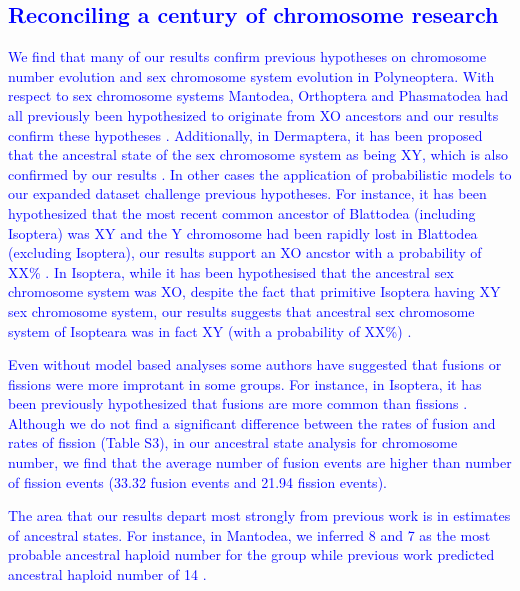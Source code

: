 \documentclass[]{rsos}%
\begin{document}
\subsection{\textcolor{blue}{Reconciling a century of chromosome research}}
\textcolor{blue}{We find that many of our results confirm previous hypotheses on chromosome number evolution and sex chromosome system evolution in Polyneoptera.
With respect to sex chromosome systems Mantodea, Orthoptera and Phasmatodea had all previously been hypothesized to originate from XO ancestors and our results confirm these hypotheses \cite{hughes1950chromosomes,blackmon2016, blackman1995sex}. 
Additionally, in Dermaptera, it has been proposed that the ancestral state of the sex chromosome system as being XY, which is also confirmed by our results \cite{blackman1995sex}.
In other cases the application of probabilistic models to our expanded dataset challenge previous hypotheses.
For instance, it has been hypothesized that the most recent common ancestor of Blattodea (including Isoptera) was XY and the Y chromosome had been rapidly lost in Blattodea (excluding Isoptera), our results support an XO ancstor with a probability of XX\% \cite{luykx1990cytogenetic, bergamaschi2007karyology}.
In Isoptera, while it has been hypothesised that the ancestral sex chromosome system was XO, despite the fact that primitive Isoptera having XY sex chromosome system, our results suggests that ancestral sex chromosome system of Isopteara was in fact XY (with a probability of XX\%) \cite{luykx1990cytogenetic,blackman1995sex}.}
 
\textcolor{blue}{Even without model based analyses some authors have suggested that fusions or fissions were more improtant in some groups.
For instance, in Isoptera, it has been previously hypothesized that fusions are more common than fissions \cite{luykx1990cytogenetic,bergamaschi2007karyology}.
Although we do not find a significant difference between the rates of fusion and rates of fission (Table S3), in our ancestral state analysis for chromosome number, we find that the average number of fusion events are higher than number of fission events (33.32 fusion events and 21.94 fission events).} 

\textcolor{blue}{The area that our results depart most strongly from previous work is in estimates of ancestral states.
For instance, in Mantodea, we inferred 8 and 7 as the most probable ancestral haploid number for the group while previous work predicted ancestral haploid number of 14 \cite{hughes1950chromosomes}.}
\end{document}
